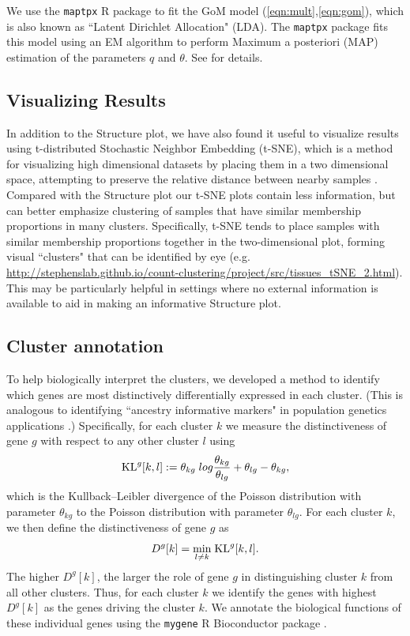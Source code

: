 \documentclass[10pt,letterpaper]{article}
\begin{document}
We use the {\tt maptpx} R package \cite{Taddy2012} to fit the GoM model (\ref{eqn:mult},\ref{eqn:gom}), which is also known as ``Latent Dirichlet Allocation" (LDA).
The {\tt maptpx} package fits this model using an EM algorithm to perform Maximum a posteriori (MAP)  estimation of the parameters $q$ and $\theta$. See \cite{Taddy2012} for details.


\subsection*{Visualizing Results}

In addition to the Structure plot, we have also found it useful to visualize results using t-distributed Stochastic Neighbor Embedding (t-SNE), which is a method for visualizing high dimensional datasets by placing them in a two dimensional space, attempting to preserve the relative distance between nearby samples \cite{Maaten2014,Maaten2008}. Compared with the Structure plot our t-SNE plots contain less information, but can better emphasize clustering of samples that have similar membership proportions in many clusters. Specifically, t-SNE tends to place samples with similar membership proportions together in the two-dimensional plot, forming visual ``clusters" that can be identified by eye (e.g. \url{http://stephenslab.github.io/count-clustering/project/src/tissues_tSNE_2.html}). This may be particularly helpful in settings where no external information is available to aid in making an informative Structure plot.


\subsection*{Cluster annotation}

To help biologically interpret the clusters, we developed a method to identify which genes are most distinctively differentially expressed in each cluster.
(This is analogous to identifying ``ancestry informative markers" in population genetics applications \cite{Rosenberg2005}.)
 Specifically, for each cluster $k$ we measure the distinctiveness of gene $g$ with respect to any other cluster $l$ using
\begin{equation}
\text{KL}^{g} [k,l] : = \theta_{kg} \; log \frac{\theta_{kg}}{\theta_{lg}} + \theta_{lg} - \theta_{kg},
\end{equation}
which is the Kullback--Leibler divergence of the Poisson distribution with parameter $\theta_{kg}$ to the Poisson distribution with parameter $\theta_{lg}$.
For each cluster $k$, we then define the distinctiveness of gene $g$ as
\begin{equation}
D^{g}[k] = \underset{l \neq k}{\min} \; \text{KL}^{g} [k, l].
\end{equation}
The higher $D^g[k]$, the larger the role of gene $g$ in distinguishing cluster $k$ from all other clusters.
Thus, for each cluster $k$ we identify the genes with highest $D^{g}[k]$ as the genes driving the cluster $k$.
We annotate the biological functions of these individual genes using the {\tt mygene} R Bioconductor package  \cite{Thompson2014}.
\end{document}
